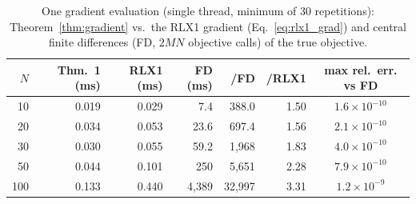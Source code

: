 \begin{table}[!t]
\centering
\caption{One gradient evaluation (single thread, minimum of 30 repetitions): Theorem~\ref{thm:gradient} vs.\ the RLX1 gradient (Eq.~\ref{eq:rlx1_grad}) and central finite differences (FD, $2MN$ objective calls) of the true objective.}
\label{tab:gradient}
\fontsize{6.2}{7.4}\selectfont
\setlength{\tabcolsep}{2.0pt}
\begin{tabular*}{\columnwidth}{@{\extracolsep{\fill}}rrrrrrc@{}}
\toprule
$N$ & Thm.~1 (ms) & RLX1 (ms) & FD (ms) & /FD & /RLX1 & max rel.\ err. vs FD \\
\midrule
10 & 0.019 & 0.029 & 7.4 & 388.0 & 1.50 & $1.6\times 10^{-10}$ \\
20 & 0.034 & 0.053 & 23.6 & 697.4 & 1.56 & $2.1\times 10^{-10}$ \\
30 & 0.030 & 0.055 & 59.2 & 1{,}968 & 1.83 & $4.0\times 10^{-10}$ \\
50 & 0.044 & 0.101 & 250 & 5{,}651 & 2.28 & $7.9\times 10^{-10}$ \\
100 & 0.133 & 0.440 & 4{,}389 & 32{,}997 & 3.31 & $1.2\times 10^{-9}$ \\
\bottomrule
\end{tabular*}
\end{table}

